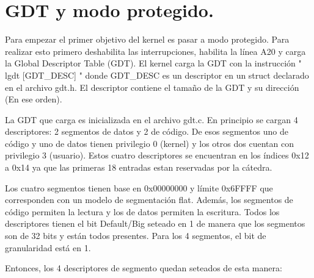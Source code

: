 \documentclass[10pt, a4paper]{article}
\date{}
\begin{document}




\maketitle


\section{GDT y modo protegido.}

Para empezar el primer objetivo del kernel es pasar a modo protegido. Para realizar esto primero deshabilita
las interrupciones, habilita la l\'inea A20 y carga la Global Descriptor Table (GDT). El kernel carga la GDT
con la instrucci\'on " lgdt [GDT\_DESC] " donde GDT\_DESC es un descriptor en un struct declarado en el archivo
gdt.h. El descriptor contiene el tama\~no de la GDT y su direcci\'on (En ese orden).

La GDT que carga es inicializada en el archivo gdt.c. En principio se cargan 4 descriptores: 2 segmentos de datos
y 2 de c\'odigo. De esos segmentos uno de c\'odigo y uno de datos tienen privilegio 0 (kernel) y los otros dos
cuentan con privilegio 3 (usuario). Estos cuatro descriptores se encuentran en los \'indices 0x12 a 0x14 ya que
las primeras 18 entradas estan reservadas por la c\'atedra.

Los cuatro segmentos tienen base en 0x00000000 y l\'imite 0x6FFFF que corresponden con un modelo de segmentaci\'on
flat. Adem\'as, los segmentos de c\'odigo permiten la lectura y los de datos permiten la escritura. Todos los
descriptores tienen el bit Default/Big seteado en 1 de manera que los segmentos son de 32 bits y est\'an todos presentes.
Para los 4 segmentos, el bit de granularidad est\'a en 1.

Entonces, los 4 descriptores de segmento quedan seteados de esta manera:
\end{document}
